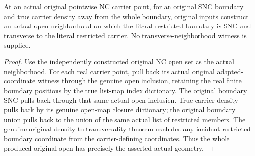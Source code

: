 \begin{theorem}
\label{hir:sharp-original-multiboundary-actual-transverse-neighborhood}
\leanok
At an actual original pointwise NC carrier point, for an original SNC
boundary and true carrier density away from the whole boundary, original
inputs construct an actual open neighborhood on which the literal
restricted boundary is SNC and transverse to the literal restricted
carrier. No transverse-neighborhood witness is supplied.
\end{theorem}
\begin{proof}
Use the independently constructed original NC open set as the actual
neighborhood. For each real carrier point, pull back its actual original
adapted-coordinate witness through the genuine open inclusion, retaining
the real finite boundary positions by the true list-map index dictionary.
The original boundary SNC pulls back through that same actual open
inclusion. True carrier density pulls back by its genuine open-map
closure dictionary; the original boundary union pulls back to the union
of the same actual list of restricted members. The genuine original
density-to-transversality theorem excludes any incident restricted
boundary coordinate from the carrier-defining coordinates. Thus the
whole produced original open has precisely the asserted actual geometry.
\end{proof}

